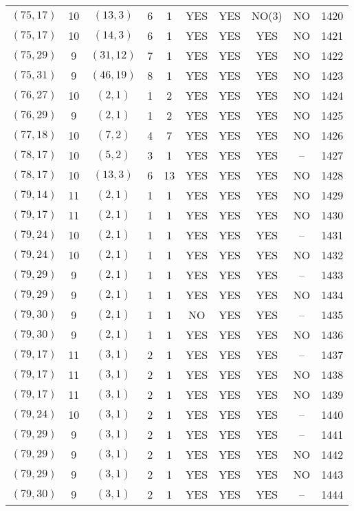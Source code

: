 \begin{longtable}{|c|c|c|c|c|c|c|c|c|c|}
$(75, 17)$ & 10 & $(13, 3)$ & 6 & 1 & YES & YES & NO(3) & NO & 1420\\
$(75, 17)$ & 10 & $(14, 3)$ & 6 & 1 & YES & YES & YES & NO & 1421\\
$(75, 29)$ & 9 & $(31, 12)$ & 7 & 1 & YES & YES & YES & NO & 1422\\
$(75, 31)$ & 9 & $(46, 19)$ & 8 & 1 & YES & YES & YES & NO & 1423\\
$(76, 27)$ & 10 & $(2, 1)$ & 1 & 2 & YES & YES & YES & NO & 1424\\
$(76, 29)$ & 9 & $(2, 1)$ & 1 & 2 & YES & YES & YES & NO & 1425\\
$(77, 18)$ & 10 & $(7, 2)$ & 4 & 7 & YES & YES & YES & NO & 1426\\
$(78, 17)$ & 10 & $(5, 2)$ & 3 & 1 & YES & YES & YES & -- & 1427\\
$(78, 17)$ & 10 & $(13, 3)$ & 6 & 13 & YES & YES & YES & NO & 1428\\
$(79, 14)$ & 11 & $(2, 1)$ & 1 & 1 & YES & YES & YES & NO & 1429\\
$(79, 17)$ & 11 & $(2, 1)$ & 1 & 1 & YES & YES & YES & NO & 1430\\
$(79, 24)$ & 10 & $(2, 1)$ & 1 & 1 & YES & YES & YES & -- & 1431\\
$(79, 24)$ & 10 & $(2, 1)$ & 1 & 1 & YES & YES & YES & NO & 1432\\
$(79, 29)$ & 9 & $(2, 1)$ & 1 & 1 & YES & YES & YES & -- & 1433\\
$(79, 29)$ & 9 & $(2, 1)$ & 1 & 1 & YES & YES & YES & NO & 1434\\
$(79, 30)$ & 9 & $(2, 1)$ & 1 & 1 & NO & YES & YES & -- & 1435\\
$(79, 30)$ & 9 & $(2, 1)$ & 1 & 1 & YES & YES & YES & NO & 1436\\
$(79, 17)$ & 11 & $(3, 1)$ & 2 & 1 & YES & YES & YES & -- & 1437\\
$(79, 17)$ & 11 & $(3, 1)$ & 2 & 1 & YES & YES & YES & NO & 1438\\
$(79, 17)$ & 11 & $(3, 1)$ & 2 & 1 & YES & YES & YES & NO & 1439\\
$(79, 24)$ & 10 & $(3, 1)$ & 2 & 1 & YES & YES & YES & -- & 1440\\
$(79, 29)$ & 9 & $(3, 1)$ & 2 & 1 & YES & YES & YES & -- & 1441\\
$(79, 29)$ & 9 & $(3, 1)$ & 2 & 1 & YES & YES & YES & NO & 1442\\
$(79, 29)$ & 9 & $(3, 1)$ & 2 & 1 & YES & YES & YES & NO & 1443\\
$(79, 30)$ & 9 & $(3, 1)$ & 2 & 1 & YES & YES & YES & -- & 1444\\

\end{longtable}
